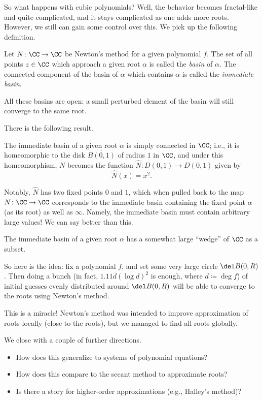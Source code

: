 \documentclass{article}
\begin{document}
So what happens with cubic polynomials? Well, the behavior becomes fractal-like and quite complicated, and it stays complicated as one adds more roots. However, we still can gain some control over this. We pick up the following definition.
\begin{definition}
	Let $N\colon\CC\to\CC$ be Newton's method for a given polynomial $f$. The set of all points $z\in\CC$ which approach a given root $\alpha$ is called the \textit{basin} of $\alpha$. The connected component of the basin of $\alpha$ which contains $\alpha$ is called the \textit{immediate basin}.
\end{definition}
\begin{remark}
	All these basins are open: a small perturbed element of the basin will still converge to the same root.
\end{remark}
There is the following result.
\begin{theorem}
	The immediate basin of a given root $\alpha$ is simply connected in $\CC$; i.e., it is homeomorphic to the disk $\overline{B(0,1)}$ of radius $1$ in $\CC$, and under this homeomorphism, $N$ becomes the function $\hat N\colon D(0,1)\to D(0,1)$ given by
	\[\hat N(x)=x^2.\]
\end{theorem}
Notably, $\hat N$ has two fixed points $0$ and $1$, which when pulled back to the map $N\colon\CC\to\CC$ corresponds to the immediate basin containing the fixed point $\alpha$ (as its root) as well as $\infty$. Namely, the immediate basin must contain arbitrary large values! We can say better than this.
\begin{theorem}
	The immediate basin of a given root $\alpha$ has a somewhat large ``wedge'' of $\CC$ as a subset.
\end{theorem}
So here is the idea: fix a polynomial $f$, and set some very large circle $\del B(0,R)$. Then doing a bunch (in fact, $1.11d(\log d)^2$ is enough, where $d\coloneqq\deg f$) of initial guesses evenly distributed around $\del B(0,R)$ will be able to converge to the roots using Newton's method.
\begin{remark}
	This is a miracle! Newton's method was intended to improve approximation of roots locally (close to the roots), but we managed to find all roots globally.
\end{remark}
We close with a couple of further directions.
\begin{itemize}
	\item How does this generalize to systems of polynomial equations?
	\item How does this compare to the secant method to approximate roots?
	\item Is there a story for higher-order approximations (e.g., Halley's method)?
\end{itemize}
\end{document}
